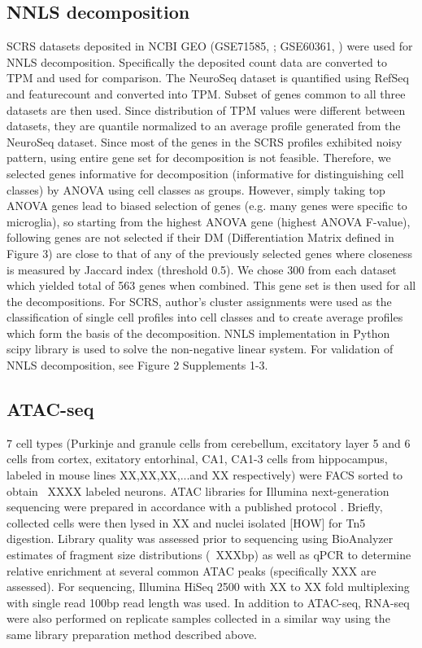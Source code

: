\subsection{NNLS decomposition}
SCRS datasets deposited in NCBI GEO (GSE71585, \cite{Tasic_2016}; GSE60361, \cite{Zeisel_2015}) were used for NNLS decomposition. Specifically the deposited count data are converted to TPM and used for comparison. The NeuroSeq dataset is quantified using RefSeq and featurecount \citep{Liao_2013} and converted into TPM. Subset of genes common to all three datasets are then used. Since distribution of TPM values were different between datasets, they are quantile normalized to an average profile generated from the NeuroSeq dataset. Since most of the genes in the SCRS profiles exhibited noisy pattern, using entire gene set for decomposition is not feasible. Therefore, we selected genes informative for decomposition (informative for distinguishing cell classes) by ANOVA using cell classes as groups. However, simply taking top ANOVA genes lead to biased selection of genes (e.g. many genes were specific to microglia), so starting from the highest ANOVA gene (highest ANOVA F-value), following genes are not selected if their DM (Differentiation Matrix defined in Figure 3) are close to that of any of the previously selected genes where closeness is measured by Jaccard index (threshold 0.5). We chose 300 from each dataset which yielded total of 563 genes when combined. This gene set is then used for all the decompositions. For SCRS, author's cluster assignments were used as the classification of single cell profiles into cell classes and to create average profiles which form the basis of the decomposition. NNLS implementation in Python scipy library \citep{Jones_2001} is used to solve the non-negative linear system. For validation of NNLS decomposition, see Figure 2 Supplements 1-3. 

\subsection{ATAC-seq}
7 cell types (Purkinje and granule cells from cerebellum, excitatory layer 5 and 6 cells from cortex, exitatory entorhinal, CA1, CA1-3 cells from hippocampus, labeled in mouse lines XX,XX,XX,...and XX respectively) were FACS sorted to obtain ~XXXX labeled neurons. ATAC libraries for Illumina next-generation sequencing were prepared in accordance with a published protocol \citep{Buenrostro_2013}. Briefly, collected cells were then lysed in XX and nuclei isolated [HOW] for Tn5 digestion. Library quality was assessed prior to sequencing using BioAnalyzer estimates of fragment size distributions (~XXXbp) as well as qPCR to determine relative enrichment at several common ATAC peaks (specifically XXX are assessed). For sequencing, Illumina HiSeq 2500 with XX to XX fold multiplexing with single read 100bp read length was used. In addition to ATAC-seq, RNA-seq were also performed on replicate samples collected in a similar way using the same library preparation method described above. 

